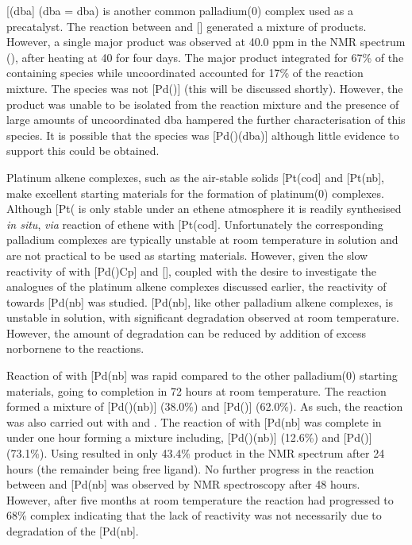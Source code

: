 [(\acrshort{dba}] (\acrshort{dba} = \acrlong{dba}) is another common palladium(0) complex used as a precatalyst.  The reaction between \tButhixantphos{} and [] generated a mixture of products.   However, a single major product was observed at 40.0 ppm in the \phosphorus{} NMR spectrum (), after heating at 40\degC{} for four days.  The major product integrated for 67\% of the \phosphorus{} containing species while uncoordinated \tButhixantphos{} accounted for 17\% of the reaction mixture.  The species was not [Pd(\tButhixantphos)] (this will be discussed shortly).  However, the product was unable to be isolated from the reaction mixture and the presence of large amounts of uncoordinated dba hampered the further characterisation of this species.  It is possible that the species was [Pd(\tButhixantphos)(dba)] although little evidence to support this could be obtained.  

Platinum alkene complexes, such as the air-stable solids [Pt(cod] and [Pt(nb], make excellent starting materials for the formation of platinum(0) complexes.\cite{Green1975b, Green1977c}  Although [Pt(\ce{C2H4)3]} is only stable under an ethene atmosphere it is readily synthesised \emph{in situ}, \emph{via} reaction of ethene with [Pt(cod].\cite{Spencer1979}  Unfortunately the corresponding palladium complexes are typically unstable at room temperature in solution and are not practical to be used as starting materials.\cite{Green1977}  However, given the slow reactivity of \tButhixantphos{} with [Pd()Cp] and [], coupled with the desire to investigate the analogues of the platinum alkene complexes discussed earlier,  the reactivity of \tButhixantphos{} towards [Pd(nb] was studied.  [Pd(nb], like other palladium alkene complexes, is unstable in solution, with significant degradation observed at room temperature.\cite{Green1977}  However, the amount of degradation can be reduced by addition of excess norbornene to the reactions.

Reaction of \tButhixantphos{} with [Pd(nb] was rapid compared to the other palladium(0) starting materials, going to completion in 72 hours at room temperature.  The reaction formed a mixture of [Pd(\tButhixantphos)(nb)] (38.0\%) and [Pd(\tButhixantphos)] (62.0\%).  As such, the reaction was also carried out with \tBusixantphos{} and \tBuxantphos{}.  The reaction of \tBuxantphos{} with [Pd(nb] was complete in under one hour forming a mixture including, [Pd(\tBuxantphos)(nb)] (12.6\%) and [Pd(\tBuxantphos)] (73.1\%).  Using \tBusixantphos{} resulted in only 43.4\% product in the \phosphorus{} NMR spectrum after 24 hours (the remainder being free ligand).  No further progress in the reaction between \tBusixantphos{} and [Pd(nb] was observed by NMR spectroscopy after 48 hours.  However, after five months at room temperature the reaction had progressed to 68\% complex indicating that the lack of reactivity was not necessarily due to degradation of the [Pd(nb].  

